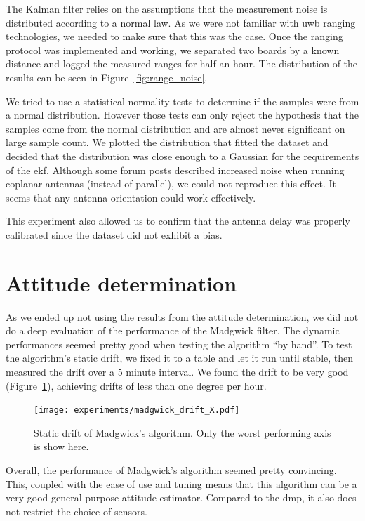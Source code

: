 \documentclass[a4paper, 12pt]{scrreprt}
\begin{document}
The Kalman filter relies on the assumptions that the measurement noise is distributed according to a normal law.
As we were not familiar with \gls{uwb} ranging technologies, we needed to make sure that this was the case.
Once the ranging protocol was implemented and working, we separated two boards by a known distance and logged the measured ranges for half an hour.
The distribution of the results can be seen in Figure~\ref{fig:range_noise}.

We tried to use a statistical normality tests to determine if the samples were from a normal distribution.
However those tests can only reject the hypothesis that the samples come from the normal distribution and are almost never significant on large sample count.
We plotted the distribution that fitted the dataset and decided that the distribution was close enough to a Gaussian for the requirements of the \gls{ekf}.
Although some forum posts described increased noise when running coplanar antennas (instead of parallel), we could not reproduce this effect.
It seems that any antenna orientation could work effectively.

This experiment also allowed us to confirm that the antenna delay was properly calibrated since the dataset did not exhibit a bias.


\section{Attitude determination}

As we ended up not using the results from the attitude determination, we did not do a deep evaluation of the performance of the Madgwick filter.
The dynamic performances seemed pretty good when testing the algorithm ``by hand''.
To test the algorithm's static drift, we fixed it to a table and let it run until stable, then measured the drift over a 5 minute interval.
We found the drift to be very good (Figure~\ref{fig:madgwick-drift}), achieving drifts of less than one degree per hour.

\begin{figure}[h]
    \centering
    \texttt{[image: experiments/madgwick\_drift\_X.pdf]}
    \caption{Static drift of Madgwick's algorithm.
    Only the worst performing axis is show here.}
    \label{fig:madgwick-drift}
\end{figure}

Overall, the performance of Madgwick's algorithm seemed pretty convincing.
This, coupled with the ease of use and tuning means that this algorithm can be a very good general purpose attitude estimator.
Compared to the \gls{dmp}, it also does not restrict the choice of sensors.
\end{document}
